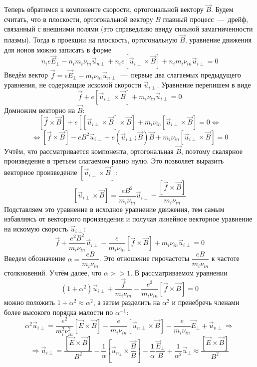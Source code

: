\documentclass[14pt, a4paper, fleqn]{extarticle}
\begin{document}
Теперь обратимся к компоненте скорости, ортогональной вектору $\vec{B}$. Будем считать, что в плоскости, ортогональной вектору $B$ главный процесс~---~дрейф, связанный с внешними полями (это справедливо ввиду сильной замагниченности плазмы). Тогда в проекции на плоскость, ортогональную $\vec{B}$, уравнение движения для ионов можно записать в форме 
$$n_ie\vec{E}_\perp-n_im_i\nu_{in}\vec{u}_{n\perp} + n_ie[\vec{u}_{i\perp}\times \vec{B}]+n_im_i\nu_{in}\vec{u}_{i\perp}=0$$
Введём вектор $\vec{f}=e\vec{E}_\perp-m_i\nu_{in}\vec{u}_{n\perp}$~---~первые два слагаемых предыдущего уравнения, не содержащие искомой скорости $\vec{u}_{i\perp}$. Уравнение перепишем в виде $$\vec{f}+e[\vec{u}_{i\perp}\times \vec{B}]+m_i\nu_{in}\vec{u}_{i\perp}=0$$
Домножим векторно на $\vec{B}$: $$[\vec{f}\times\vec{B}]+e[[\vec{u}_{i\perp}\times\vec{B}]\times\vec{B}]+m_i\nu_{in}[\vec{u}_{i\perp}\times\vec{B}]=0\Leftrightarrow$$ $$\Leftrightarrow[\vec{f}\times\vec{B}]-eB^2\vec{u}_{i\perp}+e(\vec{u}_{i\perp};\vec{B})\vec{B}+m_i\nu_{in}[\vec{u}_{i\perp}\times\vec{B}]=0$$
Учтём, что рассматривается компонента, ортогональная $\vec{B}$, поэтому скалярное произведение в третьем слагаемом равно нулю. Это позволяет выразить векторное произведение $[\vec{u}_{i\perp}\times\vec{B}]$: $$[\vec{u}_{i\perp}\times\vec{B}]=\dfrac{eB^2}{m_i\nu_{in}}\vec{u}_{i\perp}-\dfrac{[\vec{f}\times\vec{B}]}{m_i\nu_{in}}$$
Подставляем это уравнение в исходное уравнение движения, тем самым избавляясь от векторного произведения и получая линейное векторное уравнение на искомую скорость $\vec{u}_{i\perp}$: $$\vec{f}+\dfrac{e^2B^2}{m_i\nu_{in}}\vec{u}_{i\perp}-\dfrac{e}{m_i\nu_{in}}[\vec{f}\times\vec{B}]+m_i\nu_{in}\vec{u}_{i\perp}=0$$
Введем обозначение $\alpha = \dfrac{eB}{m_i\nu_{in}}$. Это отношение гирочастоты $\dfrac{eB}{m_i\nu_{in}}$ к частоте столкновений. Учтём далее, что $\alpha>>1$. В рассматриваемом уравнении $$(1+\alpha^2)\vec{u}_{i\perp}+\dfrac{\vec{f}}{m_i\nu_{in}}-\dfrac{e^2}{m_i\nu_{in}}[\vec{f}\times\vec{B}]=0$$ можно положить $1+\alpha^2\approx\alpha^2$, а затем разделить на $\alpha^2$ и пренебречь членами более высокого порядка малости по $\alpha^{-1}$: $$\alpha^2\vec{u}_{i\perp}=\dfrac{e^2}{m_i^2\nu_{in}^2}[\vec{E}\times\vec{B}]-\dfrac{e}{m_i\nu_{in}}[\vec{u}_{n\perp}\times\vec{B}]-\dfrac{e}{m_i\nu_{in}}\vec{E}_\perp+\vec{u}_{n\perp} \Rightarrow$$ $$\Rightarrow \vec{u}_{i\perp}=\dfrac{[\vec{E}\times\vec{B}]}{B^2}-\dfrac{1}{\alpha}\left[\vec{u}_{n_\perp}\times\dfrac{\vec{B}}{B}\right]-\dfrac{1}{\alpha}\dfrac{\vec{E}_\perp}{B}+\dfrac{1}{\alpha^2}\vec{u}_\perp\approx \dfrac{[\vec{E}\times\vec{B}]}{B^2}$$
\end{document}
